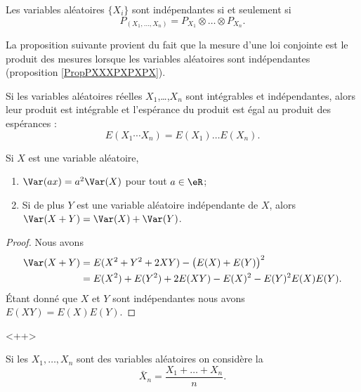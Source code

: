 \begin{proposition}     \label{PropPXXXPXPXPX}
    Les variables aléatoires \( \{ X_i \}\) sont indépendantes si et seulement si
    \begin{equation}
        P_{(X_1,\ldots,X_n)}=P_{X_1}\otimes\ldots\otimes P_{X_n}.
    \end{equation}
\end{proposition}

La proposition suivante\cite{ProbaDanielLi} provient du fait que la mesure d'une loi conjointe est le produit des mesures lorsque les variables aléatoires sont indépendantes (proposition \ref{PropPXXXPXPXPX}).
\begin{proposition}
    Si les variables aléatoires réelles \( X_1\),\ldots,\( X_n\) sont intégrables et indépendantes, alors leur produit est intégrable et l'espérance du produit est égal au produit des espérances :
    \begin{equation}
        E(X_1\cdots X_n)=E(X_1)\ldots E(X_n).
    \end{equation}
\end{proposition}

\begin{lemma}       \label{LemEXYEXEYindep}\label{PropVarPropnnlin}
    Si \( X\) est une variable aléatoire,
    \begin{enumerate}
        \item
            $\Var(ax)=a^2\Var(X)$ pour tout \( a\in\eR\);
        \item
            Si de plus \( Y\) est une variable aléatoire indépendante de \( X\), alors $\Var(X+Y)=\Var(X)+\Var(Y)$.
    \end{enumerate}
\end{lemma}

\begin{proof}
    Nous avons
    \begin{subequations}
        \begin{align}
            \Var(X+Y)&=E(X^2+Y^2+2XY)-\big( E(X)+E(Y) \big)^2\\
            &=E(X^2)+E(Y^2)+2E(XY)-E(X)^2-E(Y)^2E(X)E(Y).
        \end{align}
    \end{subequations}
    Étant donné que \( X\) et \( Y\) sont indépendantes nous avons \( E(XY)=E(X)E(Y)\).
\end{proof}
<++>

Si les \( X_1,\ldots,X_n\) sont des variables aléatoires on considère la 
\begin{equation}
    \bar X_n=\frac{ X_1+\ldots+X_n }{ n }.
\end{equation}

